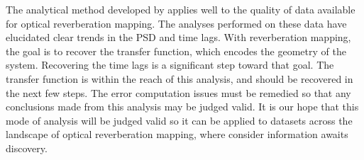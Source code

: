 \documentclass[11pt,letterpaper]{article}
\begin{document}
The analytical method developed by \cite{2013ApJ...777...24Z} applies well to the quality of data available for optical reverberation mapping. The analyses performed on these data have elucidated clear trends in the PSD and time lags. With reverberation mapping, the goal is to recover the transfer function, which encodes the geometry of the system. Recovering the time lags is a significant step toward that goal. The transfer function is within the reach of this analysis, and should be recovered in the next few steps. The error computation issues must be remedied so that any conclusions made from this analysis may be judged valid. It is our hope that this mode of analysis will be judged valid so it can be applied to datasets across the landscape of optical reverberation mapping, where consider information awaits discovery.

\newcommand{\mnras}{MNRAS}
\newcommand{\apj}{ApJ}
\newcommand{\aapr}{A\&ARv}
\newcommand{\nat}{Nature}


{}
\end{document}
